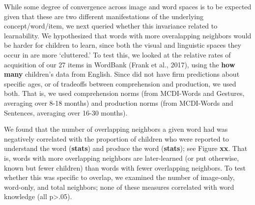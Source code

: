 \documentclass[10pt, letterpaper]{article}
\begin{document}
While some degree of convergence across image and word spaces is to be
expected given that these are two different manifestations of the
underlying concept/word/item, we next queried whether this invariance
related to learnability. We hypothesized that words with more
overalapping neighbors would be harder for children to learn, since both
the visual and linguistic spaces they occur in are more `cluttered.' To
test this, we looked at the relative rates of acquisition of our 27
items in WordBank (Frank et al., 2017), using the \textbf{how many}
children's data from English. Since did not have firm predictions about
specific ages, or of tradeoffs between comprehension and production, we
used both. That is, we used comprehension norms (from MCDI-Words and
Gestures, averaging over 8-18 months) and production norms (from
MCDI-Words and Sentences, averaging over 16-30 months).

We found that the number of overlapping neighbors a given word had was
negatively correlated with the proportion of children who were reported
to understand the word (\textbf{stats}) and produce the word
(\textbf{stats}); see Figure \textbf{xx}. That is, words with more
overlapping neighbors are later-learned (or put otherwise, known but
fewer children) than words with fewer overlapping neighbors. To test
whether this was specific to overlap, we examined the number of
image-only, word-only, and total neighbors; none of these measures
correlated with word knowledge (all p\textgreater{}.05).
\end{document}
